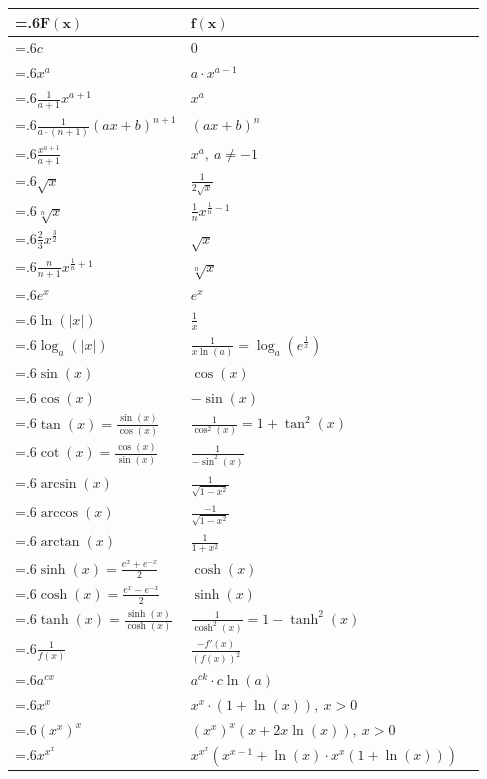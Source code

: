 \documentclass[a4paper, 10pt]{article}
\theoremstyle{definition}
\theoremstyle{named}
\begin{document}
\begin{tabularx}{\linewidth}{>{\hsize=.6\hsize\centering\arraybackslash}X|>{\centering\arraybackslash}XX}
    $\mathbf{F(x)}$ & $\mathbf{f(x)}$ \\
    \midrule
    $c$ & $0$ \\
    $x^a$ & $a \cdot x^{a - 1}$ \\
    $\frac{1}{a+1} x^{a + 1}$ & $x^a$ \\
    $\frac{1}{a \cdot (n + 1)} (ax + b)^{n + 1}$ & $(ax + b)^n$ \\
    $\frac{x^{a + 1}}{a + 1}$ & $x^a, \ a \neq -1$ \\
    $\sqrt{x}$ & $\frac{1}{2\sqrt{x}}$ \\
    $\sqrt[n]{x}$ & $\frac{1}{n}x^{\frac{1}{n} - 1}$ \\
    $\frac{2}{3}x^{\frac{3}{2}}$ & $\sqrt{x}$ \\
    $\frac{n}{n+1} x^{\frac{1}{n} + 1}$ & $\sqrt[n]{x}$ \\
    $e^x$ & $e^x$ \\
    $\ln(|x|)$ & $\frac{1}{x}$ \\
    $\log_a(|x|)$ & $\frac{1}{x \ln(a)} = \log_a(e^\frac{1}{x})$ \\
    $\sin(x)$ & $\cos(x)$ \\
    $\cos(x)$ & $-\sin(x)$ \\
    $\tan(x) = \frac{\sin(x)}{\cos(x)}$ & $\frac{1}{\cos^2(x)} = 1 + \tan^2(x)$ \\
    $\cot(x) = \frac{\cos(x)}{\sin(x)}$ & $\frac{1}{-\sin^2(x)}$ \\
    $\arcsin(x)$ & $\frac{1}{\sqrt{1 - x^2}}$ \\
    $\arccos(x)$ & $\frac{-1}{\sqrt{1 - x^2}}$ \\
    $\arctan(x)$ & $\frac{1}{1 + x^2}$ \\
    $\sinh(x) = \frac{e^x + e^{-x}}{2}$ & $\cosh(x)$ \\
    $\cosh(x) = \frac{e^x - e^{-x}}{2}$ & $\sinh(x)$ \\
    $\tanh(x) = \frac{\sinh(x)}{\cosh(x)}$ & $\frac{1}{\cosh^2(x)} = 1 - \tanh^2(x)$ \\
    $\frac{1}{f(x)}$ & $\frac{-f'(x)}{(f(x))^2}$ \\
    $a^{cx}$ & $a^{ck} \cdot c \ln(a)$ \\
    $x^x$ & $x^x \cdot (1 + \ln(x)), \ x > 0$ \\
    $(x^x)^x$ & $(x^x)^x (x + 2x \ln(x)), \ x > 0$ \\
    $x^{x^x}$ & $x^{x^x} (x^{x - 1} + \ln(x) \cdot x^x (1 + \ln(x)))$ \\
\end{tabularx}
\end{document}
